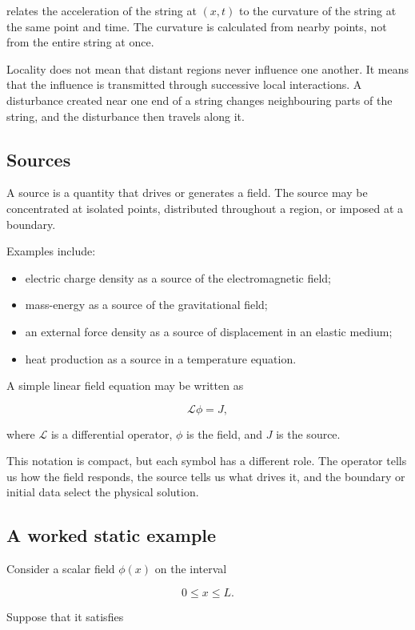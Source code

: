 relates the acceleration of the string at \((x,t)\) to the curvature of the string at the same point and time. The curvature is calculated from nearby points, not from the entire string at once.

Locality does not mean that distant regions never influence one another. It means that the influence is transmitted through successive local interactions. A disturbance created near one end of a string changes neighbouring parts of the string, and the disturbance then travels along it.

\subsection{Sources}

A source is a quantity that drives or generates a field. The source may be concentrated at isolated points, distributed throughout a region, or imposed at a boundary.

Examples include:

\begin{itemize}
    \item electric charge density as a source of the electromagnetic field;
    \item mass-energy as a source of the gravitational field;
    \item an external force density as a source of displacement in an elastic medium;
    \item heat production as a source in a temperature equation.
\end{itemize}

A simple linear field equation may be written as

\[
\mathcal{L}\phi=J,
\]

where \(\mathcal{L}\) is a differential operator, \(\phi\) is the field, and \(J\) is the source.

This notation is compact, but each symbol has a different role. The operator tells us how the field responds, the source tells us what drives it, and the boundary or initial data select the physical solution.

\subsection{A worked static example}

Consider a scalar field \(\phi(x)\) on the interval

\[
0\leq x\leq L.
\]

Suppose that it satisfies

